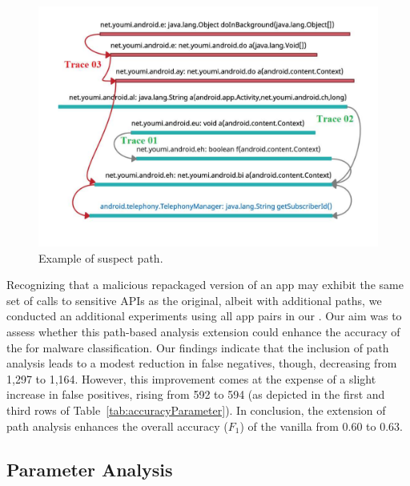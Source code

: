 \begin{figure}
\centering
\includegraphics[scale=0.28]{images/maliciousTrace_example01.pdf}
\caption{Example of suspect path.}
 \label{fig:maliciousTrace}
\end{figure}

Recognizing that a malicious repackaged version of an app may exhibit the same set of calls
to sensitive APIs as the original, albeit with additional paths, we conducted an additional experiments
using all app pairs in our \cds. Our aim was to assess whether this path-based analysis extension could enhance
the accuracy of the \mas for malware classification. Our findings indicate that the inclusion of path analysis
leads to a modest reduction in false negatives, though, decreasing from 1,297 to 1,164.
However, this improvement comes at the expense of a slight increase in false positives, rising from 592 to 594
(as depicted in the first and third rows of Table~\ref{tab:accuracyParameter}).
In conclusion, the extension of path analysis enhances the overall accuracy ($F_1$) of the vanilla
\mas from 0.60 to 0.63.

\subsection{Parameter Analysis}

